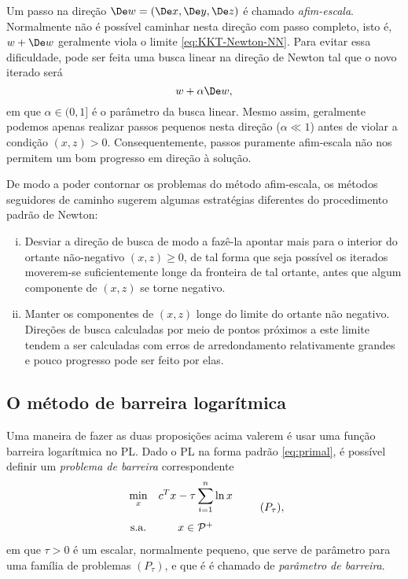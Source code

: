 Um passo na direção $\Dew = (\Dex,\Dey,\Dez)$ é chamado \emph{afim-escala}. Normalmente não é
possível caminhar nesta direção com passo completo, isto é, $w + \Dew$
geralmente viola o limite \eqref{eq:KKT-Newton-NN}. Para evitar essa dificuldade,
pode ser feita uma busca linear na direção de Newton tal que o novo iterado
será \[ w + \alpha\Dew, \] em que $\alpha \in (0,1]$ é o parâmetro da busca
linear. Mesmo assim, geralmente podemos apenas realizar passos pequenos nesta direção
($\alpha \ll 1$) antes de violar a condição $(x,z) > 0$. Consequentemente, passos
puramente afim-escala não nos permitem um bom progresso em direção à solução.


 De modo a poder contornar os problemas do método afim-escala, os métodos
 seguidores de caminho sugerem algumas estratégias diferentes do  procedimento padrão de
 Newton:
 \begin{enumerate}[(i)]
\item Desviar a direção de busca de modo a fazê-la apontar mais para o
interior do ortante não-negativo $(x,z)\geq 0$, de tal forma que seja possível
os iterados moverem-se suficientemente  longe da fronteira de tal ortante, antes que algum componente de
$(x,z)$ se torne negativo.
\item Manter os componentes de $(x,z)$  longe do limite do ortante não negativo.
Direções de busca calculadas por meio de pontos próximos a este limite tendem a
ser calculadas com erros de arredondamento relativamente grandes e pouco
progresso pode ser feito por elas.
 \end{enumerate}
 
 
 \subsection{O método de barreira logarítmica}
\label{subsec:barrier-problem}


Uma maneira de fazer  as duas proposições acima valerem é usar  uma
função barreira logarítmica no \ac{PL}. Dado o \ac{PL} na forma padrão \eqref{eq:primal}, é
possível definir um \emph{problema de barreira} correspondente 
\begin{equation}
\begin{array}{cc}
\displaystyle \min_{x} & \displaystyle c^Tx - \tau\sum_{i=1}^n \ln x \\[6mm]
\text{s.a.} & x\in\mathcal{P}^{+}
\end{array}\tag{$P_\tau$},
\label{eq:primal-barrier}
\end{equation}
em que $\tau > 0$ é um escalar, normalmente pequeno, que serve de parâmetro para
uma família de problemas $(P_\tau)$, e que é é chamado de
\emph{parâmetro de barreira}.

